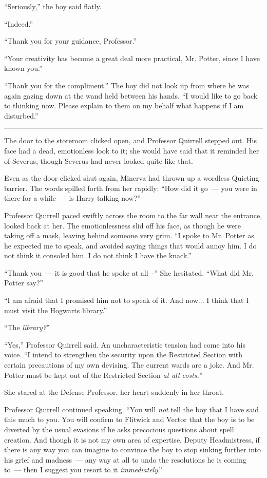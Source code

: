 ``Seriously,'' the boy said flatly.

``Indeed.''

``Thank you for your guidance, Professor.''

``Your creativity has become a great deal more practical, Mr. Potter, since I have known you.''

``Thank you for the compliment.'' The boy did not look up from where he was again gazing down at the wand held between his hands. ``I would like to go back to thinking now. Please explain to them on my behalf what happens if I am disturbed.''

\begin{center}\rule{3in}{0.4pt}\end{center}

The door to the storeroom clicked open, and Professor Quirrell stepped out. His face had a dead, emotionless look to it; she would have said that it reminded her of Severus, though Severus had never looked quite like that.

Even as the door clicked shut again, Minerva had thrown up a wordless Quieting barrier. The words spilled forth from her rapidly: ``How did it go~--- you were in there for a while~--- is Harry talking now?''

Professor Quirrell paced swiftly across the room to the far wall near the entrance, looked back at her. The emotionlessness slid off his face, as though he were taking off a mask, leaving behind someone very grim. ``I spoke to Mr. Potter as he expected me to speak, and avoided saying things that would annoy him. I do not think it consoled him. I do not think I have the knack.''

``Thank you~--- it is good that he spoke at all~-'' She hesitated. ``What did Mr. Potter say?''

``I am afraid that I promised him not to speak of it. And now... I think that I must visit the Hogwarts library.''

``The \emph{library?}''

``Yes,'' Professor Quirrell said. An uncharacteristic tension had come into his voice. ``I intend to strengthen the security upon the Restricted Section with certain precautions of my own devising. The current wards are a joke. And Mr. Potter must be kept out of the Restricted Section \emph{at all costs.}''

She stared at the Defense Professor, her heart suddenly in her throat.

Professor Quirrell continued speaking. ``You will \emph{not} tell the boy that I have said this much to you. You will confirm to Flitwick and Vector that the boy is to be diverted by the usual evasions if he asks precocious questions about spell creation. And though it is not my own area of expertise, Deputy Headmistress, if there is any way you can imagine to convince the boy to stop sinking further into his grief and madness~--- any way at all to undo the resolutions he is coming to~--- then I suggest you resort to it \emph{immediately}.''
